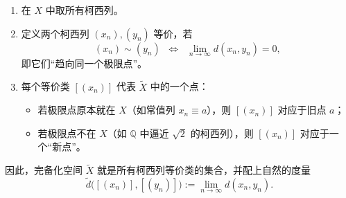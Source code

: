 \begin{enumerate}
  \item 在 $X$ 中取所有柯西列。  
  \item 定义两个柯西列 $(x_n), (y_n)$ 等价，若
  \[
  (x_n) \sim (y_n) \;\;\Longleftrightarrow\;\; \lim_{n \to \infty} d(x_n,y_n) = 0,
  \]
  即它们“趋向同一个极限点”。  
  \item 每个等价类 $[(x_n)]$ 代表 $\tilde{X}$ 中的一个点：
  \begin{itemize}
    \item 若极限点原本就在 $X$（如常值列 $x_n \equiv a$），则 $[(x_n)]$ 对应于旧点 $a$；
    \item 若极限点不在 $X$（如 $\mathbb{Q}$ 中逼近 $\sqrt{2}$ 的柯西列），则 $[(x_n)]$ 对应于一个“新点”。  
  \end{itemize}
\end{enumerate}

因此，完备化空间 $\tilde{X}$ 就是所有柯西列等价类的集合，并配上自然的度量
\[
\tilde{d}\big( [(x_n)], [(y_n)] \big) := \lim_{n \to \infty} d(x_n,y_n).
\]

